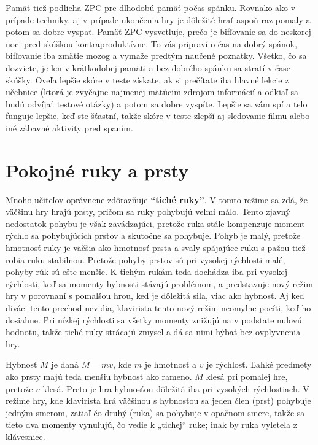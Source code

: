 \documentclass[11pt,a4paper]{book}
\begin{document}
Pamäť tiež podlieha ZPC pre dlhodobú pamäť počas spánku. Rovnako ako v prípade techniky, aj v prípade ukončenia hry je dôležité hrať aspoň raz pomaly a potom sa dobre vyspať. Pamäť ZPC vysvetľuje, prečo je bifľovanie sa do neskorej noci pred skúškou kontraproduktívne. To vás pripraví o čas na dobrý spánok, bifľovanie iba zmätie mozog a vymaže predtým naučené poznatky. Všetko, čo sa dozviete, je len v krátkodobej pamäti a bez dobrého spánku sa stratí v čase skúšky. Oveľa lepšie skóre v teste získate, ak si prečítate iba hlavné lekcie z učebnice (ktorá je zvyčajne najmenej mätúcim zdrojom informácií a odkiaľ sa budú odvíjať testové otázky) a potom sa dobre vyspíte. Lepšie sa vám spí a telo funguje lepšie, keď ste šťastní, takže skóre v teste zlepší aj sledovanie filmu alebo iné zábavné aktivity pred spaním.

\section{Pokojné ruky a prsty}\label{s:quiet-hands}
Mnoho učiteľov oprávnene zdôrazňuje \textbf{“tiché ruky”}. V tomto režime sa zdá, že väčšinu hry hrajú prsty, pričom sa ruky pohybujú veľmi málo. Tento zjavný nedostatok pohybu je však zavádzajúci, pretože ruka stále kompenzuje moment rýchlo sa pohybujúcich prstov a skutočne sa pohybuje. Pohyb je malý, pretože hmotnosť ruky je väčšia ako hmotnosť prsta a svaly spájajúce ruku s pažou tiež robia ruku stabilnou. Pretože pohyby prstov sú pri vysokej rýchlosti malé, pohyby rúk sú ešte menšie. K tichým rukám teda dochádza iba pri vysokej rýchlosti, keď sa momenty hybnosti stávajú problémom, a predstavuje nový režim hry v porovnaní s pomalšou hrou, keď je dôležitá sila, viac ako hybnosť. Aj keď diváci tento prechod nevidia, klavirista tento nový režim neomylne pocíti, keď ho dosiahne. Pri nízkej rýchlosti sa všetky momenty znižujú na v podstate nulovú hodnotu, takže tiché ruky strácajú zmysel a dá sa nimi hýbať bez ovplyvnenia hry. 

Hybnosť $M$ je daná $M = mv$, kde $m$ je hmotnosť a $v$ je rýchlosť. Ľahké predmety ako prsty majú teda menšiu hybnosť ako rameno. $M$ klesá pri pomalej hre, pretože $v$ klesá. Preto je hra hybnosťou dôležitá iba pri vysokých rýchlostiach. V režime hry, kde klavirista hrá väčšinou s hybnosťou sa jeden člen (prst) pohybuje jedným smerom, zatiaľ čo druhý (ruka) sa pohybuje v opačnom smere, takže sa tieto dva momenty vynulujú, čo vedie k „tichej“ ruke; inak by ruka vyletela z klávesnice.
\end{document}
